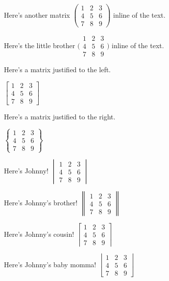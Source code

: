 \documentclass[a4paper, 10pt, english]{extarticle}
\begin{document}
Here's another matrix
$\begin{pmatrix}
1 & 2 & 3 \\
4 & 5 & 6 \\
7 & 8 & 9
\end{pmatrix}$
inline of the text.
\bigbreak

Here's the little brother
$\big(\begin{smallmatrix}
1 & 2 & 3 \\
4 & 5 & 6 \\
7 & 8 & 9
\end{smallmatrix}\big)$
inline of the text.
\bigbreak

Here's a matrix justified to the left.
\smallbreak
\begin{flushleft}
$\begin{bmatrix}
1 & 2 & 3 \\
4 & 5 & 6 \\
7 & 8 & 9
\end{bmatrix}$
\end{flushleft}
\bigbreak

Here's a matrix justified to the right.
\smallbreak
\begin{flushright}
$\begin{Bmatrix*}
1 & 2 & 3 \\
4 & 5 & 6 \\
7 & 8 & 9
\end{Bmatrix*}$
\end{flushright}
\bigbreak

Here's Johnny!
$\begin{vmatrix}
1 & 2 & 3 \\
4 & 5 & 6 \\
7 & 8 & 9
\end{vmatrix}$
\bigbreak

Here's Johnny's brother!
$\begin{Vmatrix}
1 & 2 & 3 \\
4 & 5 & 6 \\
7 & 8 & 9
\end{Vmatrix}$
\bigbreak

Here's Johnny's cousin!
$\left\lceil
\begin{matrix}
1 & 2 & 3 \\
4 & 5 & 6 \\
7 & 8 & 9
\end{matrix}
\right\rceil$
\bigbreak

Here's Johnny's baby momma!
$\left\lfloor
\begin{matrix}
1 & 2 & 3 \\
4 & 5 & 6 \\
7 & 8 & 9
\end{matrix}
\right\rfloor$
\bigbreak
\end{document}
